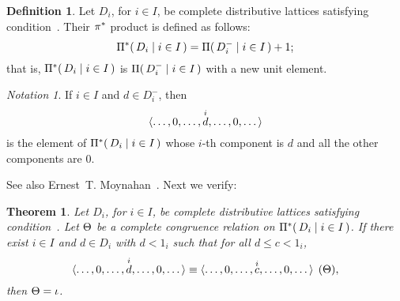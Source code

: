 \documentclass{amsart}
\theoremstyle{plain}
\newtheorem{theorem}{Theorem}
\theoremstyle{definition}
\newtheorem{definition}{Definition}
\theoremstyle{remark}
\newtheorem*{notation}{Notation}
\numberwithin{equation}{section}
\newcommand{\Prodm}[2]{\GrP(\,#1\mid#2\,)}
\newcommand{\Prodsm}[2]{\GrP^{*}(\,#1\mid#2\,)}
\newcommand{\vectsup}[2]{\vect<\dots,0,\dots,\overset{#1}{#2},%
\dots,0,\dots>}%
\begin{document}
\begin{definition}\label{D:P*} 
   Let $D_{i}$, for $i \in I$, be complete distributive 
   lattices satisfying condition~. Their $\pi^{*}$
   product is defined as follows: 
   \[
     \Prodsm{ D_{i} }{i \in I} = \Prodm{ D_{i}^{-} }{i \in I}+1;
   \]
   that is, $\Prodsm{ D_{i} }{i \in I}$ is 
   $\Prodm{ D_{i}^{-} }{i \in I}$ with a new unit element. 
\end{definition}

\begin{notation}
   If $i \in I$ and $d \in D_{i}^{-}$, then
   \[
      \vectsup{i}{d}
   \]
   is the element of $\Prodsm{ D_{i} }{i \in I}$ whose 
   $i$-th component is $d$ and all the other
   components are $0$. 
\end{notation}

See also Ernest~T. Moynahan~\cite{eM57a}. Next we verify:

\begin{theorem}\label{T:P*}  
   Let $D_{i}$, for $i \in I$, be complete distributive 
   lattices satisfying condition~. Let $\Theta$ 
   be a complete congruence relation on  
   $\Prodsm{ D_{i} }{i \in I}$. If there exist  
   $i \in I$ and $d \in D_{i}$ with $d < 1_{i}$ such 
   that for all $d \leq c < 1_{i}$,
   \begin{equation}\label{E:cong1}
      \congr\vectsup{i}{d}=\vectsup{i}{c}(\GrQ), 
   \end{equation}
   then $\Theta = \iota$.
\end{theorem}
\end{document}
